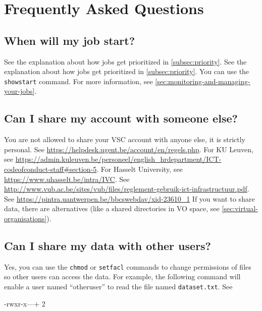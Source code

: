 \chapter{Frequently Asked Questions}
\label{ch:faq}

\section{When will my job start?}

\ifgent
See the explanation about how jobs get prioritized in \autoref{subsec:priority}.
\else
\ifbrussel
See the explanation about how jobs get prioritized in \autoref{subsec:priority}.
\else
You can use the \lstinline|showstart| command. For more information, see \autoref{sec:monitoring-and-managing-your-jobs}.
\fi %
\fi %

\section{Can I share my account with someone else?}

 You are not allowed to share your VSC account with anyone else, it is strictly personal.
\ifgent
See \url{https://helpdesk.ugent.be/account/en/regels.php}.
\fi
\ifleuven
For KU Leuven, see \url{https://admin.kuleuven.be/personeel/english_hrdepartment/ICT-codeofconduct-staff#section-5}.
For Hasselt University, see \url{https://www.uhasselt.be/intra/IVC}.
\fi
\ifbrussel
See \url{http://www.vub.ac.be/sites/vub/files/reglement-gebruik-ict-infrastructuur.pdf}.
\fi
\ifantwerpen
See \url{https://pintra.uantwerpen.be/bbcswebdav/xid-23610_1}
\fi
\ifgent
If you want to share data, there are alternatives (like a shared
directories in VO space, see \autoref{sec:virtual-organisations}).
\fi

\section{Can I share my data with other \hpc users?}

Yes, you can use the \lstinline|chmod| or \lstinline|setfacl| commands to change permissions
of files so other users can access the data. For example, the following command
will enable a user named ``otheruser'' to read the file named \lstinline|dataset.txt|.
See

\begin{prompt}
-rwxr-x---+ 2 %
\end{prompt}


